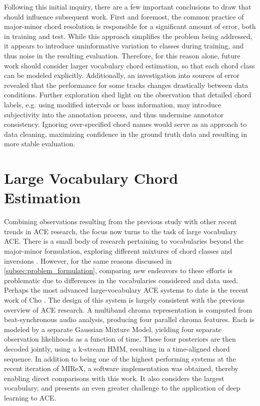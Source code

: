 Following this initial inquiry, there are a few important conclusions to draw that should influence subsequent work.
First and foremost, the common practice of major-minor chord resolution is responsible for a significant amount of error, both in training and test.
While this approach simplifies the problem being addressed, it appears to introduce uninformative variation to classes during training, and thus noise in the resulting evaluation.
Therefore, for this reason alone, future work should consider larger vocabulary chord estimation, so that each chord class can be modeled explicitly.
Additionally, an investigation into sources of error revealed that the performance for some tracks changes drastically between data conditions.
Further exploration shed light on the observation that detailed chord labels, e.g. using modified intervals or bass information, may introduce subjectivity into the annotation process, and thus undermine annotator consistency.
Ignoring over-specified chord names would serve as an approach to data cleaning, maximizing confidence in the ground truth data and resulting in more stable evaluation.


\section{Large Vocabulary Chord Estimation}
\label{subsec:large_vocabulary_ace}

Combining observations resulting from the previous study with other recent trends in ACE research, the focus now turns to the task of large vocabulary ACE.
There is a small body of research pertaining to vocabularies beyond the major-minor formulation, exploring different mixtures of chord classes and inversions \cite{Mauch2010Simultaneous, Ni2012End}.
However, for the same reasons discussed in \ref{subsec:problem_formulation}, comparing new endeavors to these efforts is problematic due to differences in the vocabularies considered and data used.
Perhaps the most advanced large-vocabulary ACE systems to date is the recent work of Cho \cite{Cho2014Improved}.
The design of this system is largely consistent with the previous overview of ACE research.
A multiband chroma representation is computed from beat-synchronous audio analysis, producing four parallel chroma features.
Each is modeled by a separate Gaussian Mixture Model, yielding four separate observation likelihoods as a function of time.
These four posteriors are then decoded jointly, using a k-stream HMM, resulting in a time-aligned chord sequence.
In addition to being one of the highest performing systems at the recent iteration of MIReX, a software implementation was obtained, thereby enabling direct comparisons with this work.
It also considers the largest vocabulary, and presents an even greater challenge to the application of deep learning to ACE.


